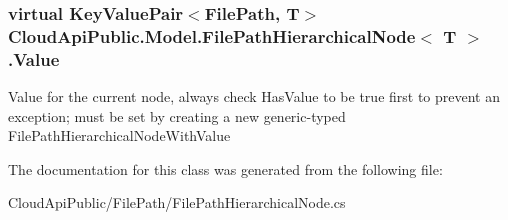 \hypertarget{class_cloud_api_public_1_1_model_1_1_file_path_hierarchical_node_3_01_t_01_4_ab5e262d004c21c69d34905bff7680e0d}{
\subsubsection[{Value}]{\setlength{\rightskip}{0pt plus 5cm}virtual Key\-Value\-Pair$<${\bf File\-Path}, T$>$ Cloud\-Api\-Public.\-Model.\-File\-Path\-Hierarchical\-Node$<$ T $>$.Value\hspace{0.3cm}{\ttfamily [get]}}}\label{class_cloud_api_public_1_1_model_1_1_file_path_hierarchical_node_3_01_t_01_4_ab5e262d004c21c69d34905bff7680e0d}


Value for the current node, always check Has\-Value to be true first to prevent an exception; must be set by creating a new generic-\/typed File\-Path\-Hierarchical\-Node\-With\-Value 



The documentation for this class was generated from the following file\-:\begin{DoxyCompactItemize}
\item 
Cloud\-Api\-Public/\-File\-Path/File\-Path\-Hierarchical\-Node.\-cs\end{DoxyCompactItemize}
